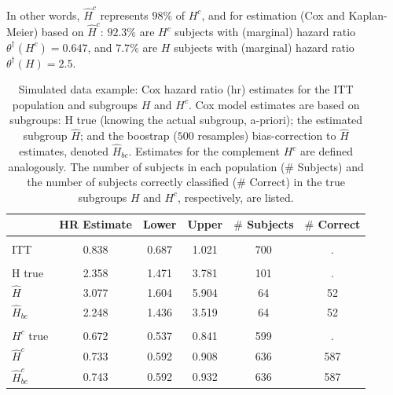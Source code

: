 \documentclass[smallextended]{svjour3}
\def\hplim{\theta^{\dagger}(H)}
\def\hcplim{\theta^{\dagger}(H^{c})}
\begin{document}
In other words, $\hat{H}^{c}$ represents $98\%$ of $H^{c}$, and for estimation (Cox and Kaplan-Meier)
based on $\hat{H}^{c}$: $92.3\%$ are $H^{c}$ subjects with (marginal) hazard ratio $\hcplim=0.647$, and $7.7\%$
are $H$ subjects with (marginal) hazard ratio $\hplim =2.5$.

\begin{table}[!h]

\caption{\label{tab:simex1_tab}\label{tab:simex1} Simulated data example: Cox hazard ratio (hr) estimates for the ITT population and subgroups $H$ and $H^{c}$.
Cox model estimates are based on subgroups: H true (knowing the actual subgroup, a-priori); the estimated subgroup $\hat{H}$; and 
the boostrap ($500$ resamples) bias-correction to $\hat{H}$ estimates, denoted $\hat{H}_{bc}$.  Estimates for the complement $H^{c}$ are defined analogously.
The number of subjects in each population ($\#$ Subjects) and the number of subjects correctly classified ($\#$ Correct) in the true subgroups $H$ and $H^{c}$, respectively, are listed.}
\centering
\fontsize{9}{11}\selectfont
\begin{tabular}[t]{lccccc}
\toprule
  & HR Estimate & Lower & Upper & $\#$ Subjects & $\#$ Correct\\
\midrule
\addlinespace[0.3em]
\multicolumn{6}{l}{\textbf{ITT}}\\
\hspace{1em}ITT & 0.838 & 0.687 & 1.021 & 700 & .\\
\addlinespace[0.3em]
\multicolumn{6}{l}{\textbf{H subgroup estimates}}\\
\hspace{1em}H true & 2.358 & 1.471 & 3.781 & 101 & .\\
\hspace{1em}$\hat{H}$ & 3.077 & 1.604 & 5.904 & 64 & 52\\
\hspace{1em}$\hat{H}_{bc}$ & 2.248 & 1.436 & 3.519 & 64 & 52\\
\addlinespace[0.3em]
\multicolumn{6}{l}{\textbf{H-complement subgroup estimates}}\\
\hspace{1em}$H^{c}$ true & 0.672 & 0.537 & 0.841 & 599 & .\\
\hspace{1em}$\hat{H}^{c}$ & 0.733 & 0.592 & 0.908 & 636 & 587\\
\hspace{1em}$\hat{H}^{c}_{bc}$ & 0.743 & 0.592 & 0.932 & 636 & 587\\
\bottomrule
\end{tabular}
\end{table}
\end{document}
